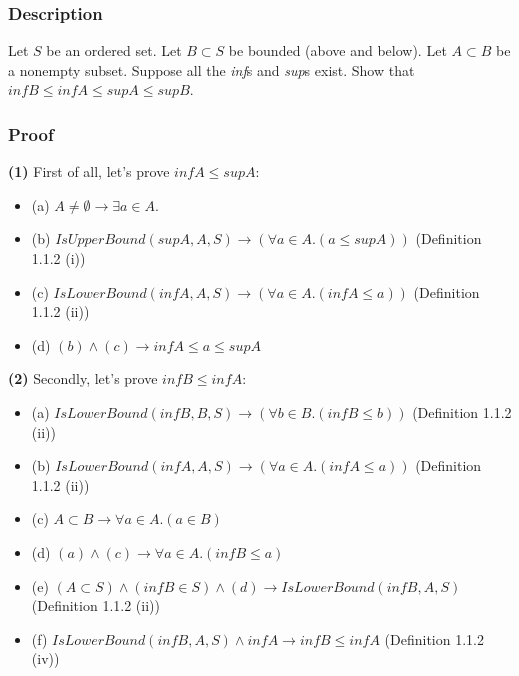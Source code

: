 \documentclass[12pt, letterpaper, oneside]{book}
\begin{document}
\subsubsection{Description}

Let $S$ be an ordered set. Let $B \subset S$ be bounded (above and below). Let $A \subset B$ be a nonempty subset.
Suppose all the \textit{inf}s and \textit{sup}s exist. Show that $inf B \le inf A \le sup A \le sup B$.

\subsubsection{Proof}

\textbf{(1)} First of all, let's prove $inf A \le sup A$:
\begin{itemize}
  \item (a) $A \ne \emptyset \rightarrow \exists a \in A$.
  \item (b) $IsUpperBound(sup A, A, S) \rightarrow (\forall a \in A. (a \le sup A))$ (Definition 1.1.2 (i))
  \item (c) $IsLowerBound(inf A, A, S) \rightarrow (\forall a \in A. (inf A \le a))$ (Definition 1.1.2 (ii))
  \item (d) $(b) \land (c) \rightarrow inf A \le a \le sup A$
\end{itemize}

\textbf{(2)} Secondly, let's prove $inf B \le inf A$:
\begin{itemize}
  \item (a) $IsLowerBound(inf B, B, S) \rightarrow (\forall b \in B. (inf B \le b))$ (Definition 1.1.2 (ii))
  \item (b) $IsLowerBound(inf A, A, S) \rightarrow (\forall a \in A. (inf A \le a))$ (Definition 1.1.2 (ii))
  \item (c) $A \subset B \rightarrow \forall a \in A. (a \in B)$
  \item (d) $(a) \land (c) \rightarrow \forall a \in A. (inf B \le a)$
  \item (e) $(A \subset S) \land (inf B \in S) \land (d) \rightarrow IsLowerBound(inf B, A, S)$ (Definition 1.1.2 (ii))
  \item (f) $IsLowerBound(inf B, A, S) \land inf A \rightarrow inf B \le inf A$ (Definition 1.1.2 (iv))
\end{itemize}
\end{document}
